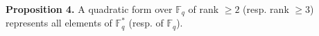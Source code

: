 \textbf{Proposition 4.} A quadratic form over $\mathbb{F}_q$ of rank $\geq 2$ (resp. rank $\geq 3$) represents all elements of $\mathbb{F}_q^*$ (resp. of $\mathbb{F}_q$).
